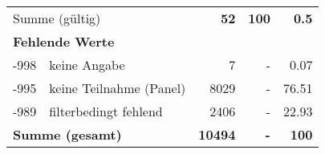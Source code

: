 \begin{longtable}{lXrrr}
     \midrule
     \multicolumn{2}{l}{Summe (gültig)} &
       \textbf{\num{52}} &
     \textbf{100} &
       \textbf{\num[round-mode=places,round-precision=2]{0,5}} \\
     \multicolumn{5}{l}{\textbf{Fehlende Werte}}\\
       -998 &
       keine Angabe &
         \num{7} &
        - &
         \num[round-mode=places,round-precision=2]{0,07} \\
       -995 &
       keine Teilnahme (Panel) &
         \num{8029} &
        - &
         \num[round-mode=places,round-precision=2]{76,51} \\
       -989 &
       filterbedingt fehlend &
         \num{2406} &
        - &
         \num[round-mode=places,round-precision=2]{22,93} \\
     \midrule
     \multicolumn{2}{l}{\textbf{Summe (gesamt)}} &
          \textbf{\num{10494}} &
        \textbf{-} &
        \textbf{100} \\
     \bottomrule
     \end{longtable}
     

